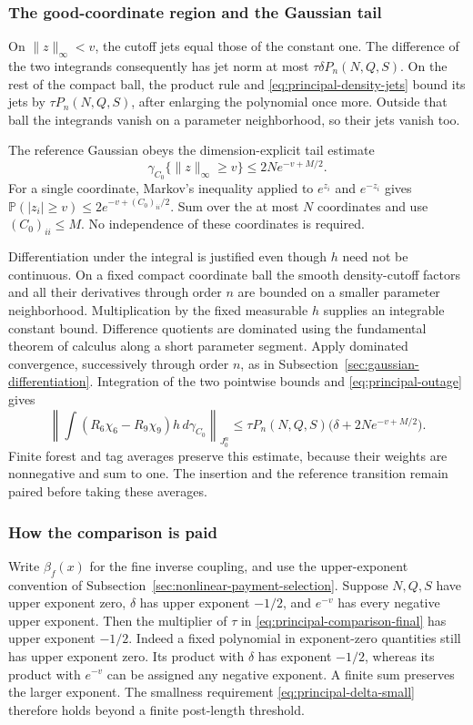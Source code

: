 \subsubsection{The good-coordinate region and the Gaussian tail}
On $\|z\|_\infty<v$, the cutoff jets equal those of the
constant one. The difference of the two integrands consequently
has jet norm at most $\tau\delta P_n(N,Q,S)$.
On the rest of the compact ball, the product rule and
\eqref{eq:principal-density-jets} bound its jets by
$\tau P_n(N,Q,S)$, after enlarging the polynomial once more.
Outside that ball the integrands vanish on a parameter
neighborhood, so their jets vanish too.

The reference Gaussian obeys the dimension-explicit tail estimate
\begin{equation}\label{eq:principal-outage}
 \gamma_{C_0}\{\|z\|_\infty\ge v\}
                                  \le2N e^{-v+M/2}.
\end{equation}
For a single coordinate, Markov's inequality applied to $e^{z_i}$
and $e^{-z_i}$ gives
$\mathbb P(|z_i|\ge v)\le2e^{-v+(C_0)_{ii}/2}$.
Sum over the at most $N$ coordinates and use $(C_0)_{ii}\le M$.
No independence of these coordinates is required.

Differentiation under the integral is justified even though $h$
need not be continuous. On a fixed compact coordinate ball the
smooth density-cutoff factors and all their derivatives through
order $n$ are bounded on a smaller parameter neighborhood.
Multiplication by the fixed measurable $h$ supplies an integrable
constant bound. Difference quotients are dominated using the
fundamental theorem of calculus along a short parameter segment.
Apply dominated convergence, successively through order $n$, as
in Subsection~\ref{sec:gaussian-differentiation}. Integration of the
two pointwise bounds and \eqref{eq:principal-outage} gives
\begin{equation}\label{eq:principal-comparison-final}
 \left\|\int(R_6\chi_6-R_9\chi_9)h\,d\gamma_{C_0}
       \right\|_{J^n_0}
 \le\tau P_n(N,Q,S)\bigl(\delta+2N e^{-v+M/2}\bigr).
\end{equation}
Finite forest and tag averages preserve this estimate, because
their weights are nonnegative and sum to one. The insertion and
the reference transition remain paired before taking these averages.

\subsubsection{How the comparison is paid}
Write $\beta_f(x)$ for the fine inverse coupling, and use the
upper-exponent convention of Subsection~\ref{sec:nonlinear-payment-selection}.
Suppose $N,Q,S$ have upper exponent zero, $\delta$ has upper
exponent $-1/2$, and $e^{-v}$ has every negative upper exponent.
Then the multiplier of $\tau$ in
\eqref{eq:principal-comparison-final} has upper exponent $-1/2$.
Indeed a fixed polynomial in exponent-zero quantities still has
upper exponent zero. Its product with $\delta$ has exponent
$-1/2$, whereas its product with $e^{-v}$ can be assigned any
negative exponent. A finite sum preserves the larger exponent.
The smallness requirement \eqref{eq:principal-delta-small}
therefore holds beyond a finite post-length threshold.

